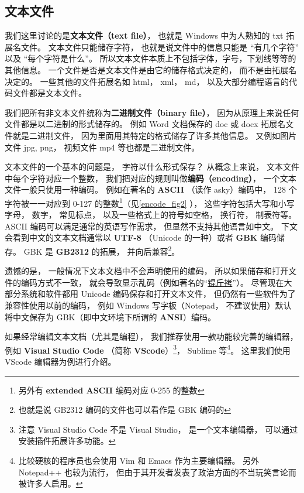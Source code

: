 
\subsection{文本文件}
我们这里讨论的是\textbf{文本文件（text file）}， 也就是 Windows 中为人熟知的 txt 拓展名文件。 文本文件只能储存字符， 也就是说文件中的信息只能是 “有几个字符” 以及 “每个字符是什么”。 所以文本文件本质上不包括字体，字号，下划线等等的其他信息。 一个文件是否是文本文件是由它的储存格式决定的， 而不是由拓展名决定的。 一些其他的文件拓展名如 html， xml， md， 以及大部分编程语言的代码文件都是文本文件。

我们把所有非文本文件统称为\textbf{二进制文件（binary file）}， 因为从原理上来说任何文件都是以二进制的形式储存的。 例如 Word 文档保存的 doc 或 docx 拓展名文件就是二进制文件， 因为里面用其特定的格式储存了许多其他信息。  又例如图片文件 jpg, png， 视频文件 mp4 等也都是二进制文件。

文本文件的一个基本的问题是， 字符以什么形式保存？ 从概念上来说， 文本文件中每个字符对应一个整数， 我们把对应的规则叫做\textbf{编码（encoding）}， 一个文本文件一般只使用一种编码。 例如在著名的 \textbf{ASCII} （读作 asky）编码中， 128 个字符被一一对应到 0-127 的整数\footnote{另外有 \textbf{extended ASCII} 编码对应 0-255 的整数}（见\autoref{encode_fig2} ）， 这些字符包括大写和小写字母， 数字， 常见标点， 以及一些格式上的符号如空格， 换行符， 制表符等。 ASCII 编码可以满足通常的英语写作需求， 但显然不支持其他语言如中文。 下文会看到中文的文本文档通常以 \textbf{UTF-8} （Unicode 的一种）或者 \textbf{GBK} 编码储存。 GBK 是 \textbf{GB2312} 的拓展， 并向后兼容\footnote{也就是说 GB2312 编码的文件也可以看作是 GBK 编码的}。

遗憾的是， 一般情况下文本文档中不会声明使用的编码， 所以如果储存和打开文件的编码方式不一致， 就会导致显示乱码（例如著名的“\href{https://baike.baidu.com/item/锟斤拷}{锟斤拷}”）。 尽管现在大部分系统和软件都用 Unicode 编码保存和打开文本文件， 但仍然有一些软件为了兼容性使用以前的编码， 例如 Windows 写字板（Notepad， 不建议使用）默认将中文保存为 GBK（即中文环境下所谓的 \textbf{ANSI}）编码。

如果经常编辑文本文档（尤其是编程）， 我们推荐使用一款功能较完善的编辑器， 例如 \textbf{Visual Studio Code} （简称 \textbf{VScode}）\footnote{注意 Visual Studio Code 不是 Visual Studio， 是一个文本编辑器， 可以通过安装插件拓展许多功能。}， Sublime 等\footnote{比较硬核的程序员也会使用 Vim 和 Emacs 作为主要编辑器。 另外 Notepad++ 也较为流行， 但由于其开发者发表了政治方面的不当玩笑言论而被许多人启用。}。 这里我们使用 VScode 编辑器为例进行介绍。

